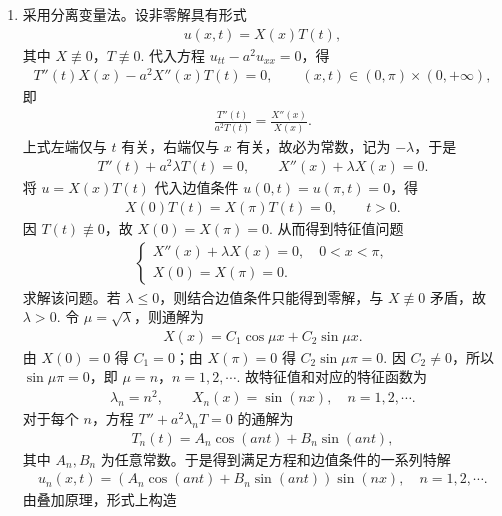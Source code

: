 \documentclass[../../main.tex]{subfiles}%
\begin{document}
\begin{solution}
\begin{enumerate}[(1)]
\item 采用分离变量法。设非零解具有形式
\begin{align*}
u(x,t)=X(x)T(t),
\end{align*}
其中 $X\not\equiv 0$，$T\not\equiv 0$. 代入方程 $u_{tt}-a^2u_{xx}=0$，得
\begin{align*}
T''(t)X(x)-a^2X''(x)T(t)=0,\qquad (x,t)\in(0,\pi)\times(0,+\infty),
\end{align*}
即
\begin{align*}
\frac{T''(t)}{a^2T(t)}=\frac{X''(x)}{X(x)}.
\end{align*}
上式左端仅与 $t$ 有关，右端仅与 $x$ 有关，故必为常数，记为 $-\lambda$，于是
\begin{align*}
T''(t)+a^2\lambda T(t)=0,\qquad X''(x)+\lambda X(x)=0.
\end{align*}
将 $u=X(x)T(t)$ 代入边值条件 $u(0,t)=u(\pi,t)=0$，得
\begin{align*}
X(0)T(t)=X(\pi)T(t)=0,\qquad t>0.
\end{align*}
因 $T(t)\not\equiv 0$，故 $X(0)=X(\pi)=0$. 从而得到特征值问题
\begin{align*}
\begin{cases}
X''(x)+\lambda X(x)=0,\quad 0<x<\pi,\\
X(0)=X(\pi)=0.
\end{cases}
\end{align*}
求解该问题。若 $\lambda\leqslant 0$，则结合边值条件只能得到零解，与 $X\not\equiv 0$ 矛盾，故 $\lambda>0$. 令 $\mu=\sqrt{\lambda}$，则通解为
\begin{align*}
X(x)=C_1\cos \mu x+C_2\sin \mu x.
\end{align*}
由 $X(0)=0$ 得 $C_1=0$；由 $X(\pi)=0$ 得 $C_2\sin \mu\pi=0$. 因 $C_2\neq 0$，所以 $\sin \mu\pi=0$，即 $\mu=n$，$n=1,2,\cdots$. 故特征值和对应的特征函数为
\begin{align*}
\lambda_n=n^2,\qquad X_n(x)=\sin(nx),\quad n=1,2,\cdots.
\end{align*}
对于每个 $n$，方程 $T''+a^2\lambda_n T=0$ 的通解为
\begin{align*}
T_n(t)=A_n\cos(an t)+B_n\sin(an t),
\end{align*}
其中 $A_n,B_n$ 为任意常数。于是得到满足方程和边值条件的一系列特解
\begin{align*}
u_n(x,t)=\left(A_n\cos(an t)+B_n\sin(an t)\right)\sin(nx),\quad n=1,2,\cdots.
\end{align*}
由叠加原理，形式上构造

\end{enumerate}
\end{solution}
\end{document}
